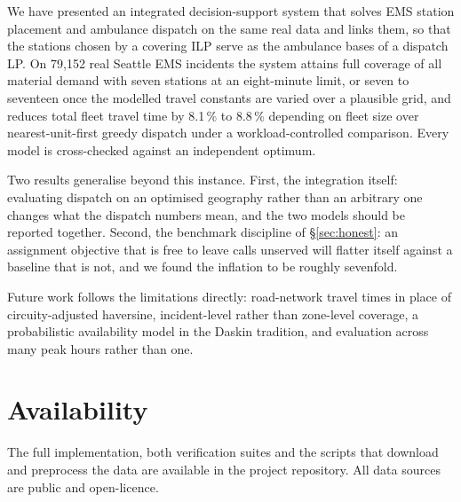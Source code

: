 \documentclass[conference]{IEEEtran}
\begin{document}
We have presented an integrated decision-support system that solves EMS station
placement and ambulance dispatch on the same real data and links them, so that
the stations chosen by a covering ILP serve as the ambulance bases of a dispatch
LP. On 79{,}152 real Seattle EMS incidents the system attains full coverage of
all material demand with seven stations at an eight-minute limit, or seven to
seventeen once the modelled travel constants are varied over a plausible grid,
and reduces total fleet travel time by 8.1\,\% to 8.8\,\% depending on fleet
size over nearest-unit-first greedy dispatch under a workload-controlled
comparison. Every model is cross-checked against an
independent optimum.

Two results generalise beyond this instance. First, the integration itself:
evaluating dispatch on an optimised geography rather than an arbitrary one
changes what the dispatch numbers mean, and the two models should be reported
together. Second, the benchmark discipline of \S\ref{sec:honest}: an assignment
objective that is free to leave calls unserved will flatter itself against a
baseline that is not, and we found the inflation to be roughly sevenfold.

Future work follows the limitations directly: road-network travel times in place
of circuity-adjusted haversine, incident-level rather than zone-level coverage,
a probabilistic availability model in the Daskin tradition, and evaluation
across many peak hours rather than one.

\section*{Availability}

The full implementation, both verification suites and the scripts that download
and preprocess the data are available in the project repository. All data
sources are public and open-licence.
\end{document}

